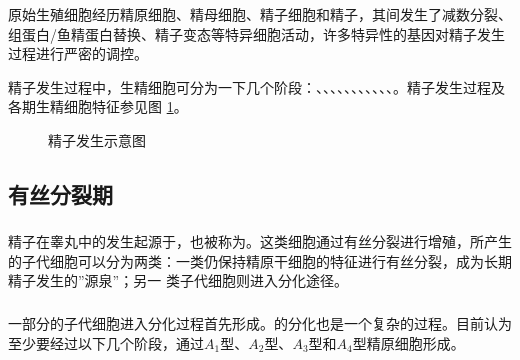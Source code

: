 原始生殖细胞经历精原细胞、精母细胞、精子细胞和精子，其间发生了减数分裂、组蛋白/鱼精蛋白替换、精子变态等特异细胞活动，许多特异性的基因对精子发生过程进行严密的调控。

精子发生过程中，生精细胞可分为一下几个阶段：、、、、、、、、、、、。精子发生过程及各期生精细胞特征参见图 \ref{figure_spermatogenesis_process}。

\begin{figure}
\centering
\myFigurePlaceholder
\caption{精子发生示意图}
\label{figure_spermatogenesis_process}
\end{figure}

\subsection{有丝分裂期}

\subsubsection{}

精子在睾丸中的发生起源于，也被称为。这类细胞通过有丝分裂进行增殖，所产生的子代细胞可以分为两类：一类仍保持精原干细胞的特征进行有丝分裂，成为长期精子发生的”源泉”；另一 类子代细胞则进入分化途径。

\subsubsection{}

一部分的子代细胞进入分化过程首先形成。的分化也是一个复杂的过程。目前认为至少要经过以下几个阶段，通过$ A_1 $型、$ A_2 $型、$ A_3 $型和$ A_4 $型精原细胞形成。

\subsubsection{}

